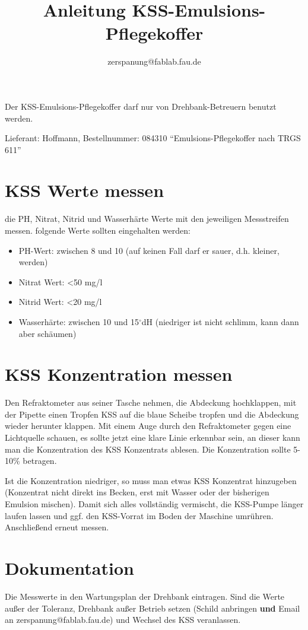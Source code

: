 \documentclass{\basedir/fablab-document}
\author{zerspanung@fablab.fau.de}
\title{Anleitung KSS-Emulsions-Pflegekoffer}
\begin{document}
Der KSS-Emulsions-Pflegekoffer darf nur von Drehbank-Betreuern benutzt werden.

Lieferant: Hoffmann, Bestellnummer: 084310 \enquote{Emulsions-Pflegekoffer nach TRGS 611}

\section{KSS Werte messen}
die PH, Nitrat, Nitrid und Wasserhärte Werte mit den jeweiligen Messstreifen messen.
folgende Werte sollten eingehalten werden:
\begin{itemize}
\item PH-Wert: zwischen 8 und 10 (auf keinen Fall darf er sauer, d.h. kleiner, werden)
\item Nitrat Wert: <50 mg/l
\item Nitrid Wert: <20 mg/l
\item Wasserhärte: zwischen 10 und 15$^\circ$dH (niedriger ist nicht schlimm, kann dann aber schäumen)
\end{itemize}

\section{KSS Konzentration messen}
Den Refraktometer aus seiner Tasche nehmen, die Abdeckung hochklappen, mit der Pipette einen Tropfen KSS auf die blaue Scheibe tropfen und die Abdeckung wieder herunter klappen.
Mit einem Auge durch den Refraktometer gegen eine Lichtquelle schauen, es sollte jetzt eine klare Linie erkennbar sein, an dieser kann man die Konzentration des KSS Konzentrats ablesen. Die Konzentration sollte 5-10\% betragen.

Ist die Konzentration niedriger, so muss man etwas KSS Konzentrat hinzugeben (Konzentrat nicht direkt ins Becken, erst mit Wasser oder der bisherigen Emulsion mischen). Damit sich alles vollständig vermischt, die KSS-Pumpe länger laufen lassen und ggf. den KSS-Vorrat im Boden der Maschine umrühren. Anschließend erneut messen.

\section{Dokumentation}
Die Messwerte in den Wartungsplan der Drehbank eintragen. Sind die Werte außer der Toleranz, Drehbank außer Betrieb setzen (Schild anbringen \textbf{und} Email an zerspanung@fablab.fau.de) und Wechsel des KSS veranlassen.

\end{document}
